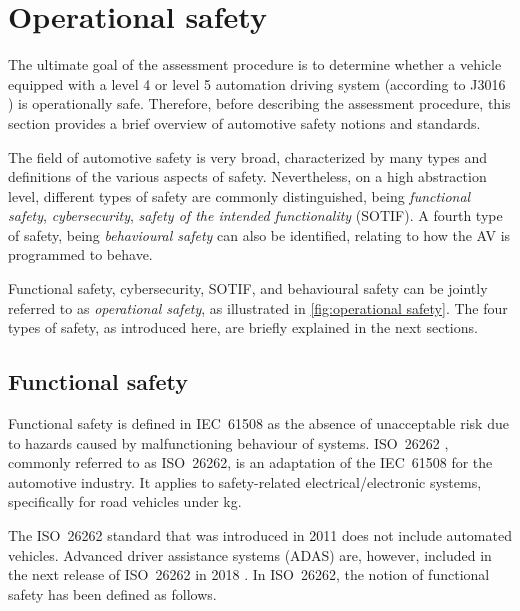 \section{Operational safety}
\label{sec:safety}

The ultimate goal of the assessment procedure is to determine whether a vehicle equipped with a level 4 or level 5 automation driving system (according to J3016 \cite{sae2018j3016}) is operationally safe. Therefore, before describing the assessment procedure, this section provides a brief overview of automotive safety notions and standards. 

The field of automotive safety is very broad, characterized by many types and definitions of the various aspects of safety. Nevertheless, on a high abstraction level, different types of safety are commonly distinguished, being \emph{functional safety}, \emph{cybersecurity}, \emph{safety of the intended functionality} (SOTIF). A fourth type of safety, being \emph{behavioural safety} can also be identified, relating to how the AV is programmed to behave. 

Functional safety, cybersecurity, SOTIF, and behavioural safety can be jointly referred to as \emph{operational safety}, as illustrated in \cref{fig:operational safety}. The four types of safety, as introduced here, are briefly explained in the next sections.

\begin{figure*}[b]
	\centering
	
	\caption{In this paper, we distinguish four aspects of operational safety: Functional safety, cybersecurity, safety of the intended functionality (SOTIF), and behavioural safety.}
	\label{fig:operational safety}
\end{figure*}



\subsection{Functional safety}
\label{sec:functional safety}

Functional safety is defined in IEC~61508 as the absence of unacceptable risk due to hazards caused by malfunctioning behaviour of systems. ISO~26262 \cite{ISO26262}, commonly referred to as ISO~26262, is an adaptation of the IEC~61508 for the automotive industry. It applies to safety-related electrical/electronic systems, specifically for road vehicles under \unit[3500]{kg}.

The ISO~26262 standard that was introduced in 2011 does not include automated vehicles. Advanced driver assistance systems (ADAS) are, however, included in the next release of ISO~26262 in 2018 \cite{ISO26262}. In ISO~26262, the notion of functional safety has been defined as follows.

